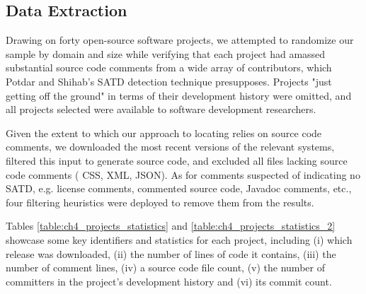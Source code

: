 \subsection{Data Extraction}

Drawing on forty open-source software projects, we attempted to randomize our sample by domain and size while verifying that each project had amassed substantial source code comments from a wide array of contributors, which Potdar and Shihab's SATD detection technique presupposes. Projects "just getting off the ground" in terms of their development history were omitted, and all projects selected were available to software development researchers.


Given the extent to which our approach to locating \SATD relies on source code comments, we downloaded the most recent versions of the relevant systems, filtered this input to generate source code, and excluded all files lacking source code comments (\eg{} CSS, XML, JSON). As for comments suspected of indicating no SATD, e.g. license comments, commented source code, Javadoc comments, etc., four filtering heuristics were deployed to remove them from the results.


Tables \ref{table:ch4_projects_statistics} and \ref{table:ch4_projects_statistics_2} showcase some key identifiers and statistics for each project, including (i) which release was downloaded, (ii) the number of lines of code it contains, (iii) the number of comment lines, (iv) a source code file count, (v) the number of committers in the project's development history and (vi) its commit count.

